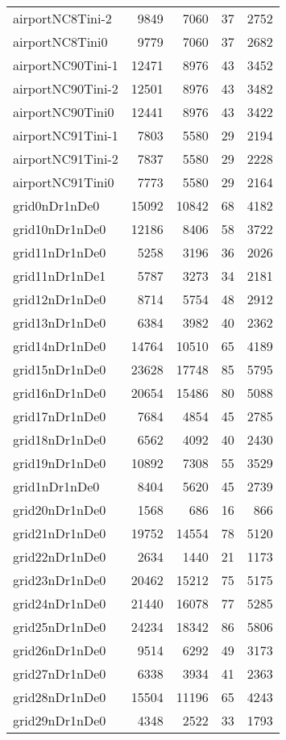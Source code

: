 \begin{longtable}{lrrrr}
airportNC8Tini-2 & 9849 & 7060 & 37 & 2752 \\
airportNC8Tini0 & 9779 & 7060 & 37 & 2682 \\
airportNC90Tini-1 & 12471 & 8976 & 43 & 3452 \\
airportNC90Tini-2 & 12501 & 8976 & 43 & 3482 \\
airportNC90Tini0 & 12441 & 8976 & 43 & 3422 \\
airportNC91Tini-1 & 7803 & 5580 & 29 & 2194 \\
airportNC91Tini-2 & 7837 & 5580 & 29 & 2228 \\
airportNC91Tini0 & 7773 & 5580 & 29 & 2164 \\
grid0nDr1nDe0 & 15092 & 10842 & 68 & 4182 \\
grid10nDr1nDe0 & 12186 & 8406 & 58 & 3722 \\
grid11nDr1nDe0 & 5258 & 3196 & 36 & 2026 \\
grid11nDr1nDe1 & 5787 & 3273 & 34 & 2181 \\
grid12nDr1nDe0 & 8714 & 5754 & 48 & 2912 \\
grid13nDr1nDe0 & 6384 & 3982 & 40 & 2362 \\
grid14nDr1nDe0 & 14764 & 10510 & 65 & 4189 \\
grid15nDr1nDe0 & 23628 & 17748 & 85 & 5795 \\
grid16nDr1nDe0 & 20654 & 15486 & 80 & 5088 \\
grid17nDr1nDe0 & 7684 & 4854 & 45 & 2785 \\
grid18nDr1nDe0 & 6562 & 4092 & 40 & 2430 \\
grid19nDr1nDe0 & 10892 & 7308 & 55 & 3529 \\
grid1nDr1nDe0 & 8404 & 5620 & 45 & 2739 \\
grid20nDr1nDe0 & 1568 & 686 & 16 & 866 \\
grid21nDr1nDe0 & 19752 & 14554 & 78 & 5120 \\
grid22nDr1nDe0 & 2634 & 1440 & 21 & 1173 \\
grid23nDr1nDe0 & 20462 & 15212 & 75 & 5175 \\
grid24nDr1nDe0 & 21440 & 16078 & 77 & 5285 \\
grid25nDr1nDe0 & 24234 & 18342 & 86 & 5806 \\
grid26nDr1nDe0 & 9514 & 6292 & 49 & 3173 \\
grid27nDr1nDe0 & 6338 & 3934 & 41 & 2363 \\
grid28nDr1nDe0 & 15504 & 11196 & 65 & 4243 \\
grid29nDr1nDe0 & 4348 & 2522 & 33 & 1793 \\

\end{longtable}
